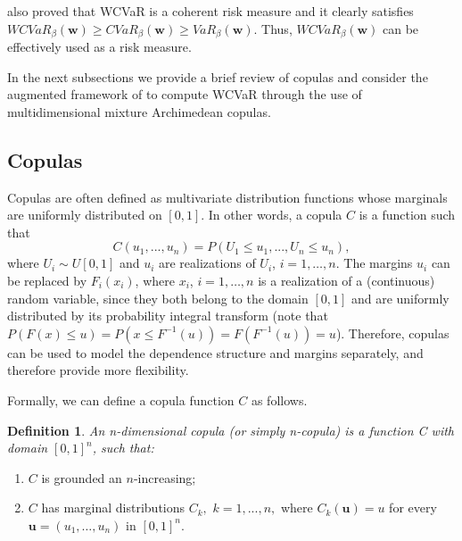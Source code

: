 \documentclass[a4paper,10pt]{article}
\newtheorem{definition}{Definition}
\begin{document}
\citet*{zhu2009worst} also proved that WCVaR is a coherent risk measure and it clearly satisfies $WCVaR_{\beta }\left( \mathbf{w}\right) \geq CVaR_{\beta }\left( \mathbf{w}\right) \geq VaR_{\beta }\left( \mathbf{w} \right) $. Thus, $WCVaR_{\beta }\left( \mathbf{w}\right) $ can be
effectively used as a risk measure.


In the next subsections we provide a brief review of copulas and consider the augmented framework of \citet*{kakouris14} to compute WCVaR through the use of multidimensional mixture Archimedean copulas.

\subsection{Copulas}

Copulas are often defined as multivariate distribution functions whose marginals are uniformly distributed on $[0,1]$. In other words, a copula $C$ is a function such that
\begin{equation}
C\left( u_{1},...,u_{n}\right) =P\left( U_{1}\leq u_{1},...,U_{n}\leq
u_{n}\right),\label{20}
\end{equation}
where $U_{i}\sim U[0,1]$ and $u_{i}$ are realizations of $U_{i}$, $i=1,\ldots,n$. The margins $u_{i}$ can be replaced by $F_{i}\left( x_{i}\right) $, where $x_{i}$, $i=1,\ldots,n$ is a realization of a (continuous) random variable, since they both belong to the domain $[0,1]$ and are uniformly distributed by its probability integral transform (note that $P\left( F\left( x\right) \leq u\right) =P\left( x\leq F^{-1}\left( u\right) \right) =F\left(F^{-1}\left( u\right) \right) =u$). Therefore, copulas can be used to model the dependence structure and margins separately, and therefore provide more flexibility.

\bigskip

Formally, we can define a copula function $C$ as follows. 

\bigskip

\begin{definition}
	An n-dimensional copula (or simply n-copula) is a function C with domain $[0,1]^{n}$, such that:
\end{definition}

\begin{enumerate}[1.]
	\item $C$ is grounded an $n$-increasing;
	\item $C$ has marginal distributions $C_{k},$ $k=1,...,n,$ where $C_{k}(\mathbf{u})=u$ for every $\mathbf{u}=\left( u_{1},\ldots,u_{n}\right) $ in $[0,1]^{n}$.
\end{enumerate}
\end{document}

